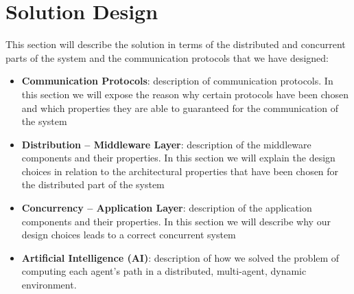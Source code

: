 \section{Solution Design}

This section will describe the solution in terms of the distributed and
concurrent parts of the system and the communication protocols that we have
designed:

\begin{itemize}
\item \textbf{Communication Protocols}:
  description of communication protocols. In this section we will expose the
  reason why certain protocols have been chosen and which properties they are
  able to guaranteed for the communication of the system
\item \textbf{Distribution -- Middleware Layer}:
  description of the middleware components and their properties. In this
  section we will explain the design choices in relation to the architectural
  properties that have been chosen for the distributed part of the system
\item \textbf{Concurrency -- Application Layer}:
  description of the application components and their properties. In this
  section we will describe why our design choices leads to a correct concurrent
  system
\item \textbf{Artificial Intelligence (AI)}:
  description of how we solved the problem of computing each agent's path
  in a distributed, multi-agent, dynamic environment.
\end{itemize}





